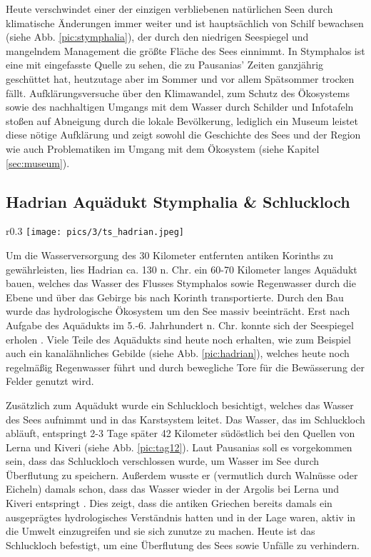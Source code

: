 \documentclass[preprint]{geomorphica} %
\begin{document}
Heute verschwindet einer der einzigen verbliebenen natürlichen Seen durch klimatische Änderungen immer weiter und ist hauptsächlich von Schilf bewachsen (siehe Abb. \ref{pic:stymphalia}), der durch den niedrigen Seespiegel und mangelndem Management die größte Fläche des Sees einnimmt. In Stymphalos ist eine mit eingefasste Quelle zu sehen, die zu Pausanias' Zeiten ganzjährig geschüttet hat, heutzutage aber im Sommer und vor allem Spätsommer trocken fällt. Aufklärungsversuche über den Klimawandel, zum Schutz des Ökosystems sowie des nachhaltigen Umgangs mit dem Wasser durch Schilder und Infotafeln stoßen auf Abneigung durch die lokale Bevölkerung, lediglich ein Museum leistet diese nötige Aufklärung und zeigt sowohl die Geschichte des Sees und der Region wie auch Problematiken im Umgang mit dem Ökosystem (siehe Kapitel \ref{sec:museum}).

\subsection{Hadrian Aquädukt Stymphalia \& Schluckloch}

\begin{wrapfigure}{r}{0.3\textwidth}
    \centering
    \texttt{[image: pics/3/ts\_hadrian.jpeg]}
    \caption{Kanalähnlicher Teil des Handrian Aquädukts [Foto: Tabea Storch].}
    \label{pic:hadrian}
    \vspace{-5mm}
\end{wrapfigure}

Um die Wasserversorgung des 30 Kilometer entfernten antiken Korinths zu gewährleisten, lies Hadrian ca. 130 n. Chr. ein 60-70 Kilometer langes Aquädukt bauen, welches das Wasser des Flusses Stymphalos sowie Regenwasser durch die Ebene und über das Gebirge bis nach Korinth transportierte. Durch den Bau wurde das hydrologische Ökosystem um den See massiv beeinträcht. Erst nach Aufgabe des Aquädukts im 5.-6. Jahrhundert n. Chr. konnte sich der Seespiegel erholen \cite{seguin2500YearsAnthropogenic2019}. Viele Teile des Aquädukts sind heute noch erhalten, wie zum Beispiel auch ein kanalähnliches Gebilde (siehe Abb. \ref{pic:hadrian}), welches heute noch regelmäßig Regenwasser führt und durch bewegliche Tore für die Bewässerung der Felder genutzt wird.

Zusätzlich zum Aquädukt wurde ein Schluckloch besichtigt, welches das Wasser des Sees aufnimmt und in das Karstsystem leitet. Das Wasser, das im Schluckloch abläuft, entspringt 2-3 Tage später 42 Kilometer südöstlich bei den Quellen von Lerna und Kiveri (siehe Abb. \ref{pic:tag12}). Laut Pausanias soll es vorgekommen sein, dass das Schluckloch verschlossen wurde, um Wasser im See durch Überflutung zu speichern. Außerdem wusste er (vermutlich durch Walnüsse oder Eicheln) damals schon, dass das Wasser wieder in der Argolis bei Lerna und Kiveri entspringt \cite{unkelHydraHermesHerkules2020, seguin2500YearsAnthropogenic2019}. Dies zeigt, dass die antiken Griechen bereits damals ein ausgeprägtes hydrologisches Verständnis hatten und in der Lage waren, aktiv in die Umwelt einzugreifen und sie sich zunutze zu machen. Heute ist das Schluckloch befestigt, um eine Überflutung des Sees sowie Unfälle zu verhindern.
\end{document}
